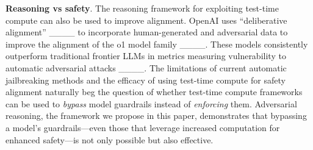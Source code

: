 



\noindent \textbf{Reasoning vs safety}. The reasoning framework for exploiting test-time compute can also be used to improve alignment.
OpenAI uses ``deliberative alignment'' ____ to incorporate human-generated and adversarial data to improve the alignment of the o1 model family ____.
These models consistently outperform traditional frontier LLMs in metrics measuring vulnerability to automatic adversarial attacks ____.
The limitations of current automatic jailbreaking methods and the efficacy of using test-time compute for safety alignment naturally beg the question of whether test-time compute frameworks can be used to \textit{bypass} model guardrails instead of \textit{enforcing} them. Adversarial reasoning, the framework we propose in this paper, demonstrates that bypassing a model's guardrails—even those that leverage increased computation for enhanced safety—is not only possible but also effective. 

